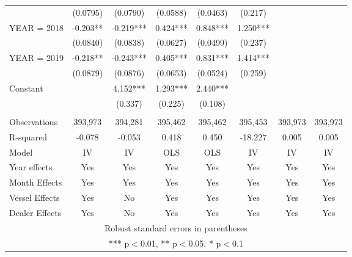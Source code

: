 \begin{tabular}{lccccccc}
 & (0.0795) & (0.0790) & (0.0588) & (0.0463) & (0.217) &  &  \\
YEAR = 2018 & -0.203** & -0.219*** & 0.424*** & 0.848*** & 1.250*** &  &  \\
 & (0.0840) & (0.0838) & (0.0627) & (0.0499) & (0.237) &  &  \\
YEAR = 2019 & -0.218** & -0.243*** & 0.405*** & 0.831*** & 1.414*** &  &  \\
 & (0.0879) & (0.0876) & (0.0653) & (0.0524) & (0.259) &  &  \\
Constant &  & 4.152*** & 1.293*** & 2.440*** &  &  &  \\
 &  & (0.337) & (0.225) & (0.108) &  &  &  \\
 &  &  &  &  &  &  &  \\
Observations & 393,973 & 394,281 & 395,462 & 395,462 & 395,453 & 393,973 & 393,973 \\
R-squared & -0.078 & -0.053 & 0.418 & 0.450 & -18.227 & 0.005 & 0.005 \\
Model & IV & IV & OLS & OLS & IV & IV & IV \\
Year effects & Yes & Yes & Yes & Yes & Yes & Yes & Yes \\
Month Effects & Yes & Yes & Yes & Yes & Yes & Yes & Yes \\
Vessel Effects & Yes & No & Yes & Yes & Yes & Yes & Yes \\
 Dealer Effects & Yes & No & Yes & Yes & Yes & Yes & Yes \\ \hline
\multicolumn{8}{c}{ Robust standard errors in parentheses} \\
\multicolumn{8}{c}{ *** p$<$0.01, ** p$<$0.05, * p$<$0.1} \\
\end{tabular}
